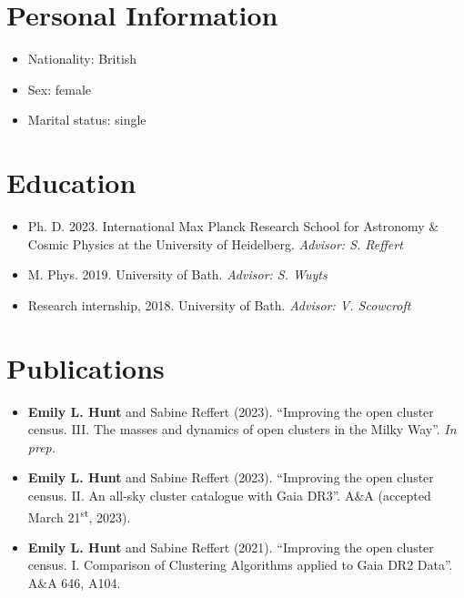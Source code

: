 \documentclass[12pt, letterpaper]{hunt-cv}
\begin{document}
\cvTitle

\section*{Personal Information}

\begin{itemize}
    \item Nationality: British
    \item Sex: female
    \item Marital status: single
\end{itemize}



\section*{Education}

\begin{itemize}
    \item Ph. D. 2023. International Max Planck Research School for Astronomy \& Cosmic Physics at the University of Heidelberg. \emph{Advisor: S. Reffert}
    \item M. Phys. 2019. University of Bath. \emph{Advisor: S. Wuyts}
    \item Research internship, 2018. University of Bath. \emph{Advisor: V. Scowcroft}
\end{itemize}


\section*{Publications}

\begin{itemize}
    \item \textbf{Emily L. Hunt} and Sabine Reffert (2023). ``Improving the open cluster census. III. The masses and dynamics of open clusters in the Milky Way''. \emph{In prep.}
    \item \textbf{Emily L. Hunt} and Sabine Reffert (2023). ``Improving the open cluster census. II. An all-sky cluster catalogue with Gaia DR3''. A\&A (accepted March 21\textsuperscript{st}, 2023).
    \item \textbf{Emily L. Hunt} and Sabine Reffert (2021). ``Improving the open cluster census. I. Comparison of Clustering Algorithms applied to Gaia DR2 Data''. A\&A 646, A104.
\end{itemize}
\end{document}
